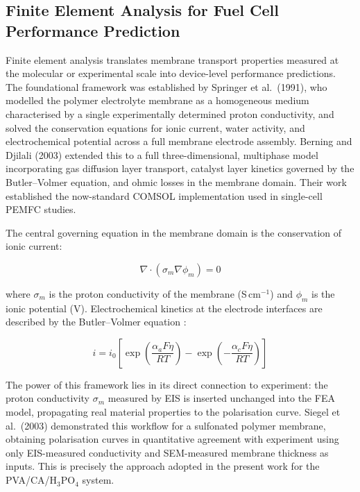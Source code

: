 \documentclass[12pt,a4paper]{report}
\begin{document}
\subsection{Finite Element Analysis for Fuel Cell Performance 
Prediction}

Finite element analysis translates membrane transport properties 
measured at the molecular or experimental scale into device-level 
performance predictions. The foundational framework was established 
by Springer et al.\ (1991), who modelled the polymer electrolyte 
membrane as a homogeneous medium characterised by a single 
experimentally determined proton conductivity, and solved the 
conservation equations for ionic current, water activity, and 
electrochemical potential across a full membrane electrode assembly. 
Berning and Djilali (2003) extended this to a full three-dimensional, 
multiphase model incorporating gas diffusion layer transport, catalyst 
layer kinetics governed by the Butler--Volmer equation, and ohmic 
losses in the membrane domain. Their work established the now-standard 
COMSOL implementation used in single-cell PEMFC studies.

The central governing equation in the membrane domain is the 
conservation of ionic current:

\begin{equation}
\nabla \cdot \left( \sigma_{m} \nabla \phi_{m} \right) = 0
\end{equation}

where \(\sigma_{m}\) is the proton conductivity of the membrane 
(S\,cm\(^{-1}\)) and \(\phi_{m}\) is the ionic potential (V). 
Electrochemical kinetics at the electrode interfaces are described 
by the Butler--Volmer equation \cite{66}:

\begin{equation}
i = i_0 \left[ 
\exp\!\left(\frac{\alpha_a F \eta}{RT}\right) - 
\exp\!\left(-\frac{\alpha_c F \eta}{RT}\right) 
\right]
\end{equation}

The power of this framework lies in its direct connection to 
experiment: the proton conductivity \(\sigma_{m}\) measured by EIS 
is inserted unchanged into the FEA model, propagating real material 
properties to the polarisation curve. Siegel et al.\ (2003) 
demonstrated this workflow for a sulfonated polymer membrane, 
obtaining polarisation curves in quantitative agreement with 
experiment using only EIS-measured conductivity and SEM-measured 
membrane thickness as inputs. This is precisely the approach adopted 
in the present work for the PVA/CA/H\(_3\)PO\(_4\) system.
\end{document}
